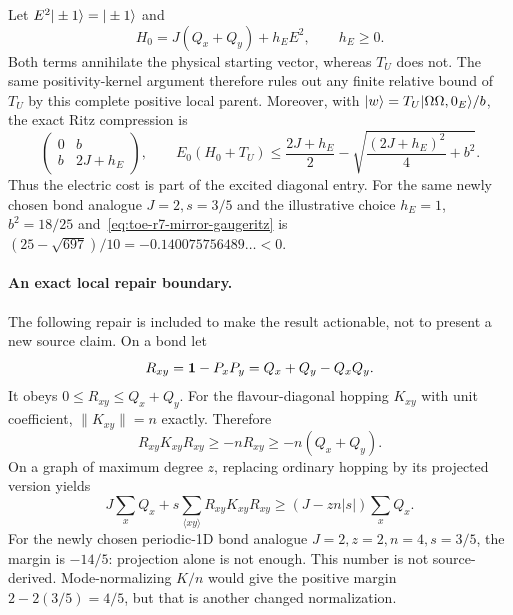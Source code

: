 Let $E^2|\pm1\rangle=|\pm1\rangle$ and
\begin{equation}
 H_0=J(Q_x+Q_y)+h_EE^2,\qquad h_E\geq0.
\end{equation}
Both terms annihilate the physical starting vector, whereas $T_U$ does not.
The same positivity-kernel argument therefore rules out any finite relative
bound of $T_U$ by this complete positive local parent.  Moreover, with
$|w\rangle=T_U|\Omega\Omega,0_E\rangle/b$, the exact Ritz compression is
\begin{equation}
 \begin{pmatrix}0&b\\b&2J+h_E\end{pmatrix},\qquad
 E_0(H_0+T_U)\leq \frac{2J+h_E}{2}
 -\sqrt{\frac{(2J+h_E)^2}{4}+b^2}.
 \label{eq:toe-r7-mirror-gaugeritz}
\end{equation}
Thus the electric cost is part of the excited diagonal entry.  For the same
newly chosen bond analogue $J=2,s=3/5$ and the illustrative choice $h_E=1$,
$b^2=18/25$ and~\eqref{eq:toe-r7-mirror-gaugeritz} is
$(25-\sqrt{697})/10=-0.140075756489\ldots<0$.

\paragraph{An exact local repair boundary.}

The following repair is included to make the result actionable, not to present
a new source claim.  On a bond let
\begin{equation}
 R_{xy}=\mathbf 1-P_xP_y=Q_x+Q_y-Q_xQ_y.
\end{equation}
It obeys $0\leq R_{xy}\leq Q_x+Q_y$.  For the flavour-diagonal hopping
$K_{xy}$ with unit coefficient, $\|K_{xy}\|=n$ exactly.  Therefore
\begin{equation}
 R_{xy}K_{xy}R_{xy}\geq-nR_{xy}
 \geq-n(Q_x+Q_y).
 \label{eq:toe-r7-mirror-projectedbound}
\end{equation}
On a graph of maximum degree $z$, replacing ordinary hopping by its projected
version yields
\begin{equation}
 J\sum_xQ_x+s\sum_{\langle xy\rangle}R_{xy}K_{xy}R_{xy}
 \geq (J-zn|s|)\sum_xQ_x.
 \label{eq:toe-r7-mirror-rawrepair}
\end{equation}
For the newly chosen periodic-1D bond analogue
$J=2,z=2,n=4,s=3/5$, the margin is $-14/5$: projection alone is not enough.
This number is not source-derived.  Mode-normalizing $K/n$ would give the
positive margin $2-2(3/5)=4/5$, but that is another changed normalization.

